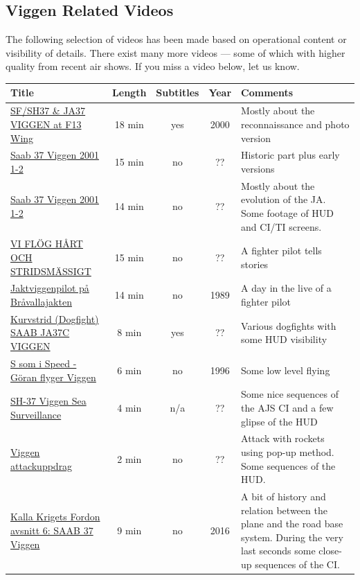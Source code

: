 \documentclass[a4paper]{report}
\begin{document}
\begin{landscape}
\chapter{Viggen Related Videos}
The following selection of videos has been made based on operational content or visibility of details. There exist many more videos --- some of which with higher quality from recent air shows. If you miss a video below, let us know.

\begin{table}[!th]
\begin{tabular}{|p{5cm}|c|c|c|p{9cm}|}
\hline
Title & Length & Subtitles & Year & Comments \\
\hline

\href{https://www.youtube.com/watch?v=kBq5qA8r4dA}{SF/SH37 \& JA37 VIGGEN at F13 Wing} & 18 min & yes & 2000 & Mostly about the reconnaissance and photo version\\
\href{https://www.youtube.com/watch?v=0sRACNVVmpE}{Saab 37 Viggen 2001 1-2} & 15 min & no & ?? & Historic part plus early versions\\
\href{https://www.youtube.com/watch?v=pAPteuBsRGg}{Saab 37 Viggen 2001 1-2} & 14 min & no & ?? & Mostly about the evolution of the JA. Some footage of HUD and CI/TI screens.\\
\href{https://www.youtube.com/watch?v=fmqXa0oetUA}{VI FLÖG HÅRT OCH STRIDSMÄSSIGT} & 15 min & no & ?? & A fighter pilot tells stories\\
\href{https://www.youtube.com/watch?v=ErK3zaNRccE&}{Jaktviggenpilot på Bråvallajakten} & 14 min & no & 1989 & A day in the live of a fighter pilot\\
\href{https://www.youtube.com/watch?v=qaNt9_sQdGI}{Kurvstrid (Dogfight) SAAB JA37C VIGGEN} & 8 min & yes & ?? & Various dogfights with some HUD visibility\\
\href{https://www.youtube.com/watch?v=oB6-jJEWjWk}{S som i Speed - Göran flyger Viggen} & 6 min & no & 1996 & Some low level flying\\
\href{https://www.youtube.com/watch?v=gwgJNdWZlj0}{SH-37 Viggen Sea Surveillance} & 4 min & n/a & ?? & Some nice sequences of the AJS CI and a few glipse of the HUD\\
\href{https://www.youtube.com/watch?v=mgPS5-SbI0c}{Viggen attackuppdrag} & 2 min & no & ?? & Attack with rockets using pop-up method. Some sequences of the HUD.\\
\href{https://www.youtube.com/watch?v=eQjAp7bTnUg}{Kalla Krigets Fordon avsnitt 6: SAAB 37 Viggen} & 9 min & no & 2016 & A bit of history and relation between the plane and the road base system. During the very last seconds some close-up sequences of the CI.\\

\end{tabular}
\end{table}
\end{landscape}
\end{document}
